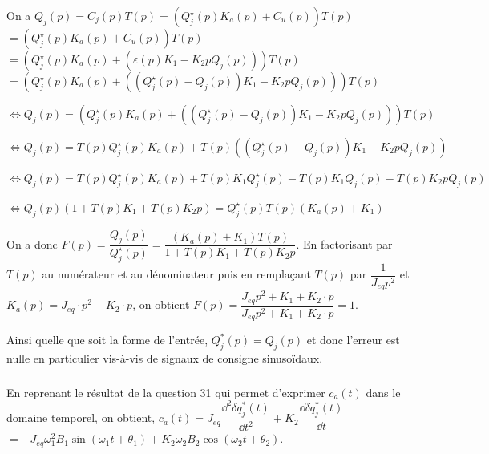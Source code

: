 \documentclass[10pt,fleqn]{article} %
\begin{document}
On a $Q_j(p) = C_j(p) T(p)= \left( Q_j^{\star}(p) K_a(p) + C_u(p) \right) T(p)$
$= \left( Q_j^{\star}(p) K_a(p) + C_u(p) \right) T(p)$
$= \left( Q_j^{\star}(p) K_a(p) + \left( \varepsilon(p) K_1 - K_2 p Q_j(p) \right)\right) T(p)$
$= \left( Q_j^{\star}(p) K_a(p) + \left( \left(Q_j^{\star}(p) - Q_j(p) \right) K_1 - K_2 p Q_j(p) \right)\right) T(p)$


$\Leftrightarrow Q_j(p) = 
\left(
    Q_j^{\star}(p) K_a(p) + 
    \left( 
        \left(Q_j^{\star}(p) - Q_j(p) \right) K_1 - K_2 p Q_j(p) 
    \right)
\right) T(p)$

$\Leftrightarrow Q_j(p) = 
    T(p)Q_j^{\star}(p) K_a(p) + 
    T(p)\left( 
        \left(Q_j^{\star}(p) - Q_j(p) \right) K_1 - K_2 p Q_j(p) 
    \right) $

$\Leftrightarrow Q_j(p) = 
    T(p)Q_j^{\star}(p) K_a(p) + 
        T(p)K_1 Q_j^{\star}(p) -T(p)K_1  Q_j(p)   - T(p)K_2 p Q_j(p) 
     $

$\Leftrightarrow Q_j(p)\left(1     +T(p)K_1     + T(p)K_2 p\right)= 
      Q_j^{\star}(p)T(p) \left(  K_a(p)     +K_1 \right)     $

On a donc $F(p)=\dfrac{Q_j(p)}{Q_j^{\star}(p)}=\dfrac{\left(K_a(p) +K_1\right)T(p)}{1+T(p)K_1 + T(p)K_2 p}$.
En factorisant par $T(p)$ au numérateur et au dénominateur puis en remplaçant $T(p)$ par $\dfrac{1}{J_{eq}p^2}$ et $K_a(p)=J_{eq}\cdot p^2+K_2\cdot p$, on obtient $
F(p)=\dfrac{J_{eq}p^2+K_1+K_2\cdot p}{J_{eq}p^2+K_1+K_2\cdot p}=1
$.

Ainsi quelle que soit la forme de l'entrée, $Q^*_j(p)=Q_j(p)$ et donc l'erreur est nulle en particulier vis-à-vis de signaux de consigne sinusoïdaux.

\subparagraph{}\textit{}%

En reprenant le résultat de la question 31 qui permet d'exprimer $c_a(t)$ dans le domaine temporel, on obtient, $
c_a(t)=J_{eq}\dfrac{\dd ^2\delta q^*_j(t)}{\dd t^2}+K_{2}\dfrac{\dd \delta q^*_j(t)}{\dd t}$
$=-J_{eq}\omega_1^2B_1\sin\left(\omega_1t+\theta_1\right)+K_2\omega_2B_2\cos\left(\omega_2t+\theta_2\right)
$.

\subparagraph{}\textit{}%
\end{document}
